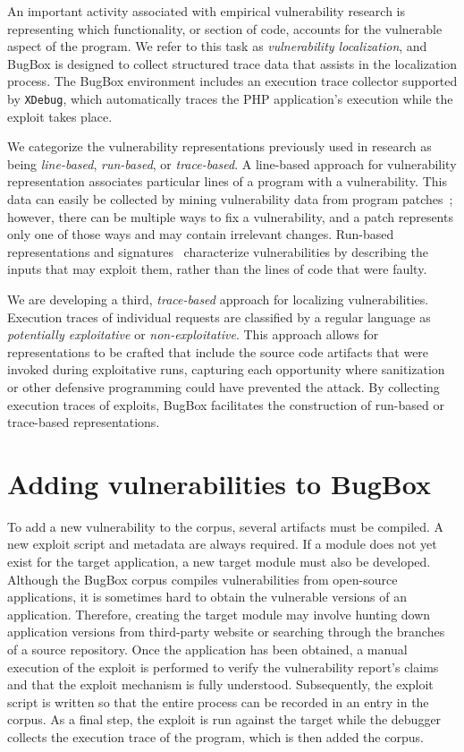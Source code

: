 \documentclass[letterpaper,twocolumn,10pt]{article}
\begin{document}
An important activity associated with empirical vulnerability research is representing which functionality, or section of code, accounts for the vulnerable aspect of the program. We refer to this task as \emph{vulnerability localization}, and BugBox is designed to collect structured trace data that assists in the localization process. The BugBox environment includes an execution trace collector supported by \texttt{XDebug}, which automatically traces the PHP application's execution while the exploit takes place.

We categorize the vulnerability representations previously used in research as being \textit{line-based}, \textit{run-based}, or \textit{trace-based}. A line-based approach for vulnerability representation associates particular lines of a program with a vulnerability. This data can easily be collected by mining vulnerability data from program patches~\cite{mappingfaults}; however, there can be multiple ways to fix a vulnerability, and a patch represents only one of those ways and may contain irrelevant changes.  Run-based representations and signatures~\cite{automaticvulsig} characterize vulnerabilities by describing the inputs that may exploit them, rather than the lines of code that were faulty.

We are developing a third, \textit{trace-based} approach for localizing vulnerabilities. Execution traces of individual requests are classified by a regular language as \emph{potentially exploitative} or \emph{non-exploitative}. This approach allows for representations to be crafted that include the source code artifacts that were invoked during exploitative runs, capturing each opportunity where sanitization or other defensive programming could have prevented the attack. By collecting execution traces of exploits, BugBox facilitates the construction of run-based or trace-based representations.


\section{Adding vulnerabilities to BugBox}

To add a new vulnerability to the corpus, several artifacts must be compiled. A new exploit script and metadata are always required. If a module does not yet exist for the target application, a new target module must also be developed.  Although the BugBox corpus compiles vulnerabilities from open-source applications, it is sometimes hard to obtain the vulnerable versions of an application. Therefore, creating the target module may involve hunting down application versions from third-party website or searching through the branches of a source repository. Once the application has been obtained, a manual execution of the exploit is performed to verify the vulnerability report's claims and that the exploit mechanism is fully understood. Subsequently, the exploit script is written so that the entire process can be recorded in an entry in the corpus. As a final step, the exploit is run against the target while the debugger collects the execution trace of the program, which is then added the corpus.\par
\end{document}
